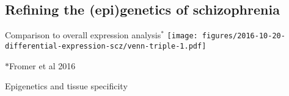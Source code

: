 \documentclass{beamer}
\begin{document}
\subsection{Refining the (epi)genetics of schizophrenia}







\begin{frame}{Comparison to overall expression analysis\(^\ast\)}
\texttt{[image: figures/2016-10-20-differential-expression-scz/venn-triple-1.pdf]}

{\tiny\(\ast\)Fromer et al 2016}
\end{frame}

\begin{frame}{Epigenetics and tissue specificity}

\end{frame}
\end{document}
